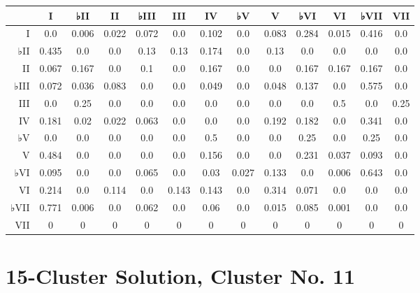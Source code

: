 \begin{table}[htbp]
\begin{minipage}{\linewidth}
\setlength{\tymax}{0.5\linewidth}
\centering
\small
\begin{tabulary}{\textwidth}{@{}RCCCCCCCCCCCC@{}} \toprule
&I&♭II&II&♭III&III&IV&♭V&V&♭VI&VI&♭VII&VII\\
\midrule
I&0.0&0.006&0.022&0.072&0.0&0.102&0.0&0.083&0.284&0.015&0.416&0.0\\
♭II&0.435&0.0&0.0&0.13&0.13&0.174&0.0&0.13&0.0&0.0&0.0&0.0\\
II&0.067&0.167&0.0&0.1&0.0&0.167&0.0&0.0&0.167&0.167&0.167&0.0\\
♭III&0.072&0.036&0.083&0.0&0.0&0.049&0.0&0.048&0.137&0.0&0.575&0.0\\
III&0.0&0.25&0.0&0.0&0.0&0.0&0.0&0.0&0.0&0.5&0.0&0.25\\
IV&0.181&0.02&0.022&0.063&0.0&0.0&0.0&0.192&0.182&0.0&0.341&0.0\\
♭V&0.0&0.0&0.0&0.0&0.0&0.5&0.0&0.0&0.25&0.0&0.25&0.0\\
V&0.484&0.0&0.0&0.0&0.0&0.156&0.0&0.0&0.231&0.037&0.093&0.0\\
♭VI&0.095&0.0&0.0&0.065&0.0&0.03&0.027&0.133&0.0&0.006&0.643&0.0\\
VI&0.214&0.0&0.114&0.0&0.143&0.143&0.0&0.314&0.071&0.0&0.0&0.0\\
♭VII&0.771&0.006&0.0&0.062&0.0&0.06&0.0&0.015&0.085&0.001&0.0&0.0\\
VII&0&0&0&0&0&0&0&0&0&0&0&0\\

\bottomrule

\end{tabulary}
\end{minipage}
\end{table}

\section{15-Cluster Solution, Cluster No. 11}
\label{15-clustersolutionclusterno.11}

